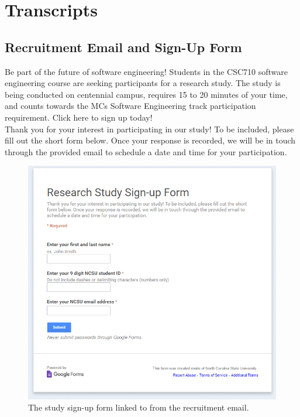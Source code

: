 \documentclass{sig-alternate-05-2015}
\begin{document}



\appendix

\section{Transcripts}

\subsection{Recruitment Email and Sign-Up Form}

\noindent Be part of the future of software engineering! Students in the CSC710 software engineering course are seeking participants for a research study. The study is being conducted on centennial campus, requires 15 to 20 minutes of your time, and counts towards the MCs Software Engineering track participation requirement. Click here to sign up today!\\

\noindent Thank you for your interest in participating in our study! To be included, please fill out the short form below. Once your response is recorded, we will be in touch through the provided email to schedule a date and time for your participation.

\begin{figure}[!h]
    \centering
    \includegraphics[width=\linewidth]{appendix/signup_form.png}
    \caption{The study sign-up form linked to from the recruitment email.}
\end{figure}
\end{document}
